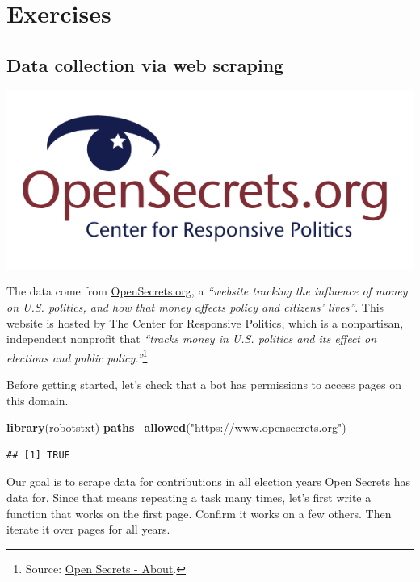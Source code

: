 \documentclass[
]{article}
\newenvironment{Shaded}{\begin{snugshade}}{\end{snugshade}}
\newcommand{\FunctionTok}[1]{\textcolor[rgb]{0.13,0.29,0.53}{\textbf{#1}}}
\newcommand{\NormalTok}[1]{#1}
\newcommand{\StringTok}[1]{\textcolor[rgb]{0.31,0.60,0.02}{#1}}
\begin{document}
\section{Exercises}\label{exercises}

\subsection{Data collection via web
scraping}\label{data-collection-via-web-scraping}

\includegraphics[width=0.8\linewidth]{img/opensecrets}

The data come from \href{https://www.opensecrets.org}{OpenSecrets.org},
a \emph{``website tracking the influence of money on U.S. politics, and
how that money affects policy and citizens' lives''}. This website is
hosted by The Center for Responsive Politics, which is a nonpartisan,
independent nonprofit that \emph{``tracks money in U.S. politics and its
effect on elections and public policy.''}\footnote{Source:
  \href{https://www.opensecrets.org/about/}{Open Secrets - About}.}

Before getting started, let's check that a bot has permissions to access
pages on this domain.

\begin{Shaded}
\begin{Highlighting}[]
\FunctionTok{library}\NormalTok{(robotstxt)}
\FunctionTok{paths\_allowed}\NormalTok{(}\StringTok{"https://www.opensecrets.org"}\NormalTok{)}
\end{Highlighting}
\end{Shaded}

\begin{verbatim}
## [1] TRUE
\end{verbatim}

Our goal is to scrape data for contributions in all election years Open
Secrets has data for. Since that means repeating a task many times,
let's first write a function that works on the first page. Confirm it
works on a few others. Then iterate it over pages for all years.
\end{document}
